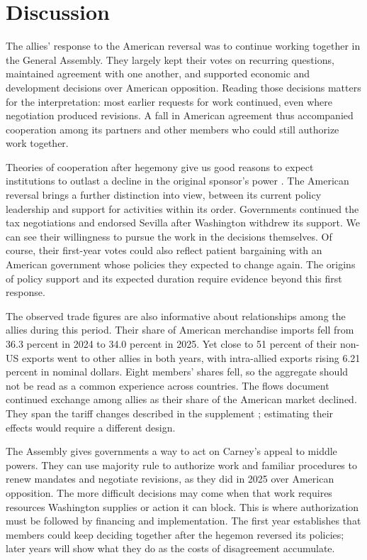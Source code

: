 \documentclass[12pt,authoryear]{elsarticle}
\begin{document}
\section{Discussion}

The allies' response to the American reversal was to continue working together in the General Assembly. They largely kept their votes on recurring questions, maintained agreement with one another, and supported economic and development decisions over American opposition. Reading those decisions matters for the interpretation: most earlier requests for work continued, even where negotiation produced revisions. A fall in American agreement thus accompanied cooperation among its partners and other members who could still authorize work together.

Theories of cooperation after hegemony give us good reasons to expect institutions to outlast a decline in the original sponsor's power \citep{keohane:1984,snidal:1985}. The American reversal brings a further distinction into view, between its current policy leadership and support for activities within its order. Governments continued the tax negotiations and endorsed Sevilla after Washington withdrew its support. We can see their willingness to pursue the work in the decisions themselves. Of course, their first-year votes could also reflect patient bargaining with an American government whose policies they expected to change again. The origins of policy support and its expected duration require evidence beyond this first response.

The observed trade figures are also informative about relationships among the allies during this period. Their share of American merchandise imports fell from 36.3 percent in 2024 to 34.0 percent in 2025. Yet close to 51 percent of their non-US exports went to other allies in both years, with intra-allied exports rising 6.21 percent in nominal dollars. Eight members' shares fell, so the aggregate should not be read as a common experience across countries. The flows document continued exchange among allies as their share of the American market declined. They span the tariff changes described in the supplement \citep{crs:2025:tariffs,canada:2025:countertariffs}; estimating their effects would require a different design.

The Assembly gives governments a way to act on Carney's appeal to middle powers. They can use majority rule to authorize work and familiar procedures to renew mandates and negotiate revisions, as they did in 2025 over American opposition. The more difficult decisions may come when that work requires resources Washington supplies or action it can block. This is where authorization must be followed by financing and implementation. The first year establishes that members could keep deciding together after the hegemon reversed its policies; later years will show what they do as the costs of disagreement accumulate.

\setlength{\parskip}{0pt}
\newpage
\singlespacing
\small


\end{document}
